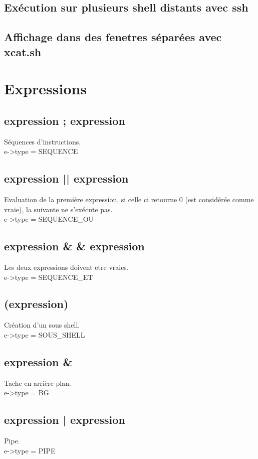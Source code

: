 \documentclass[12pt]{article}
\begin{document}
\subsection{Exécution sur plusieurs shell distants avec ssh}

\subsection{Affichage dans des fenetres séparées avec xcat.sh}

\newpage
\section{Expressions}
\subsection{expression ; expression}
Séquences d'instructions.
\\
e->type = SEQUENCE

\subsection{expression || expression}
Evaluation de la première expression, si celle ci retourne 0 (est considérée comme vraie), la suivante ne s'exécute pas.
\\
e->type = SEQUENCE\_OU

\subsection{expression \& \& expression}
Les deux expressions doivent etre vraies.
\\
e->type = SEQUENCE\_ET

\subsection{(expression)}
Création d'un sous shell.
\\
e->type = SOUS\_SHELL

\subsection{expression \&}
Tache en arrière plan.
\\
e->type = BG

\subsection{expression | expression}
Pipe.
\\
e->type = PIPE
\end{document}
